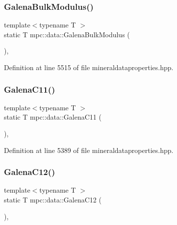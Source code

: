 \subsubsection{\texorpdfstring{Galena\+Bulk\+Modulus()}{GalenaBulkModulus()}}
{\footnotesize\ttfamily template$<$typename T $>$ \\
static T mpc\+::data\+::\+Galena\+Bulk\+Modulus (\begin{DoxyParamCaption}{ }\end{DoxyParamCaption})\hspace{0.3cm}{\ttfamily [inline]}, {\ttfamily [static]}}



Definition at line 5515 of file mineraldataproperties.\+hpp.

\mbox{\label{namespacempc_1_1data_a44aed7835ab23f082a3f86695db463a5}} 
\subsubsection{\texorpdfstring{Galena\+C11()}{GalenaC11()}}
{\footnotesize\ttfamily template$<$typename T $>$ \\
static T mpc\+::data\+::\+Galena\+C11 (\begin{DoxyParamCaption}{ }\end{DoxyParamCaption})\hspace{0.3cm}{\ttfamily [inline]}, {\ttfamily [static]}}



Definition at line 5389 of file mineraldataproperties.\+hpp.

\mbox{\label{namespacempc_1_1data_acecfb3bc59c8ecff003dc23895a2e2e7}} 
\subsubsection{\texorpdfstring{Galena\+C12()}{GalenaC12()}}
{\footnotesize\ttfamily template$<$typename T $>$ \\
static T mpc\+::data\+::\+Galena\+C12 (\begin{DoxyParamCaption}{ }\end{DoxyParamCaption})\hspace{0.3cm}{\ttfamily [inline]}, {\ttfamily [static]}}



